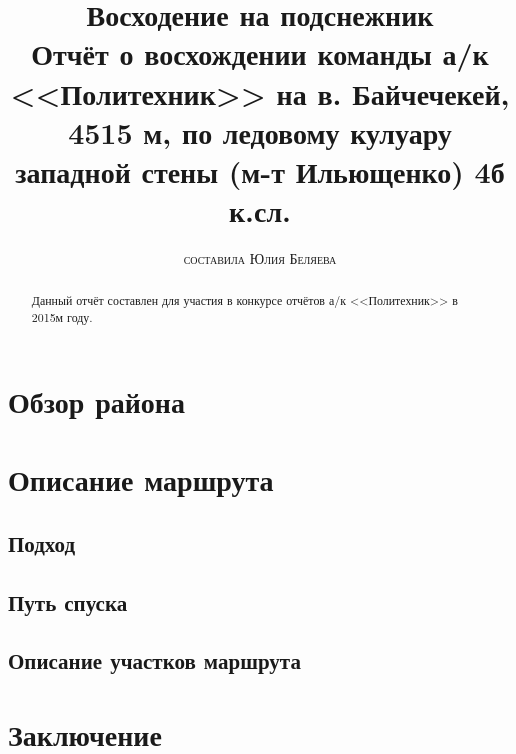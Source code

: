\documentclass[fleqn, 12pt]{extarticle}
\begin{document}

\title{\textbf{Восходение на подснежник}\\
\large{Отчёт о восхождении команды а/к <<Политехник>> на в. Байчечекей, 4515 м, по ледовому кулуару западной стены (м-т Ильющенко) 4б к.сл.}}
\author{\textsc{составила Юлия Беляева}}
\date{\GITAuthorDate}

\maketitle

\begin{abstract}
	Данный отчёт составлен для участия в конкурсе отчётов а/к <<Политехник>> в 2015м году.
\end{abstract}

\section{Обзор района}

\section{Описание маршрута}
\subsection{Подход}
\subsection{Путь спуска}
\subsection{Описание участков маршрута}
\section{Заключение}
\end{document}

